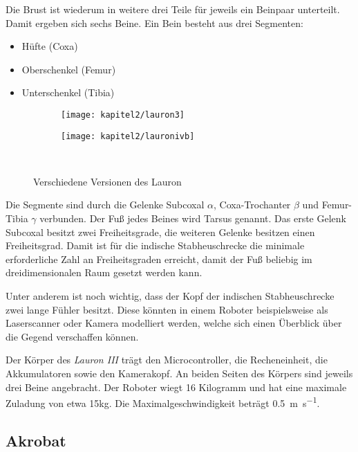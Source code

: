 Die Brust ist wiederum in weitere drei Teile für jeweils ein Beinpaar unterteilt. Damit ergeben sich sechs Beine. Ein Bein besteht aus drei Segmenten:
\begin{itemize}
  \item Hüfte (Coxa)
  \item Oberschenkel (Femur)
  \item Unterschenkel (Tibia)
\end{itemize}

\begin{figure}[b!]
  \centering
  \begin{subfigure}[b]{.4\linewidth}
    \centering
    \texttt{[image: kapitel2/lauron3]}
    \label{kap2:lauron3}
  \end{subfigure}%
  \qquad
  \begin{subfigure}[b]{.4\linewidth}
    \centering
    \texttt{[image: kapitel2/lauronivb]}
    \label{kap2:lauron4b}
  \end{subfigure}\\
  \caption{Verschiedene Versionen des Lauron}
  \label{kap2lauron}
\end{figure}

Die Segmente sind durch die Gelenke Subcoxal $\alpha$, Coxa-Trochanter $\beta$ und Femur-Tibia $\gamma$ verbunden. Der Fuß jedes Beines wird Tarsus genannt. Das erste Gelenk Subcoxal besitzt zwei Freiheitsgrade, die weiteren Gelenke besitzen einen Freiheitsgrad. Damit ist für die indische Stabheuschrecke die minimale erforderliche Zahl an Freiheitsgraden erreicht, damit der Fuß beliebig im dreidimensionalen Raum gesetzt werden kann.

Unter anderem ist noch wichtig, dass der Kopf der indischen Stabheuschrecke zwei lange Fühler besitzt. Diese könnten in einem Roboter beispielsweise als Laserscanner oder Kamera modelliert werden, welche sich einen Überblick über die Gegend verschaffen können.

Der Körper des \emph{Lauron III} trägt den Microcontroller, die Recheneinheit, die Akkumulatoren sowie den Kamerakopf. An beiden Seiten des Körpers sind jeweils drei Beine angebracht. Der Roboter wiegt 16 Kilogramm und hat eine maximale Zuladung von etwa 15kg. Die Maximalgeschwindigkeit beträgt \SI{0.5}{\metre\per\second}. \autocite{gassmann2000} \autocite{troilo2007}

\subsection{Akrobat}

